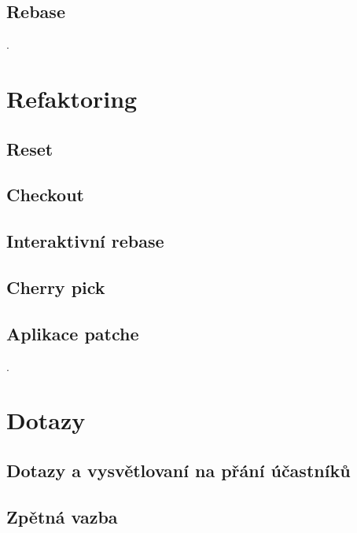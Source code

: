 \documentclass[11pt]{article}
\begin{document}
\subsection{Rebase}

.

\section{Refaktoring}
\subsection{Reset}
\subsection{Checkout}
\subsection{Interaktivní rebase}
\subsection{Cherry pick}
\subsection{Aplikace patche}

.

\section{Dotazy}
\subsection{Dotazy a vysvětlovaní na přání účastníků}
\subsection{Zpětná vazba}
\end{document}
